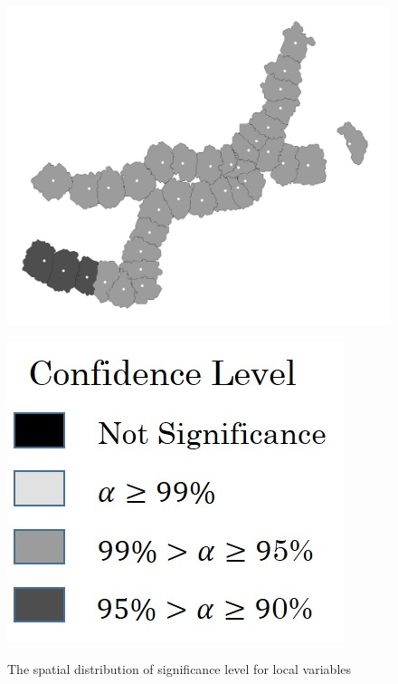 \documentclass[utf8]{article}
\begin{document}
\begin{figure}[htbp]
	\vfill
	
	\begin{minipage}{0.48\linewidth}
		\centering
		\includegraphics[width=\linewidth]{TenantProportion}
	\end{minipage}
	\hfill
	\begin{minipage}[c]{0.48\linewidth}
		\centering
		\includegraphics[scale=0.3]{Legend}\\
	\end{minipage}
	
	\caption{The spatial distribution of significance level for local variables}
	\label{fig:SignificanceDistribution}
\end{figure}
\end{document}
